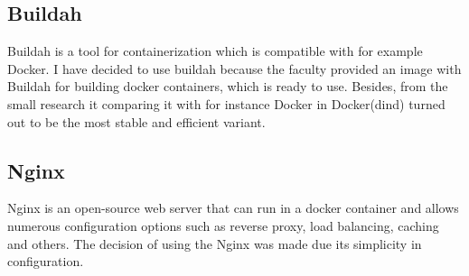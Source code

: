 \subsection{Buildah} Buildah is a tool for containerization which is compatible with for example Docker. I have decided to use buildah because the faculty provided an image with Buildah for building docker containers, which is ready to use. Besides, from the small research it comparing it with for instance Docker in Docker(dind) turned out to be the most stable and efficient variant.

\subsection{Nginx} Nginx is an open-source web server that can run in a docker container and allows numerous configuration options such as reverse proxy, load balancing, caching and others. The decision of using the Nginx was made due its simplicity in configuration.
